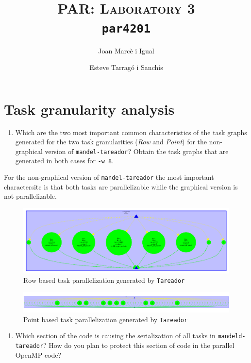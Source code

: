 \documentclass[a4paper]{article}
\title{
	\textsc{PAR: Laboratory 3} \\
	\texttt{\large par4201}
}
\author{Joan Marcè i Igual \and Esteve Tarragó i Sanchís}
\begin{document}
\maketitle
\tableofcontents
\pagebreak

\section{Task granularity analysis}

\begin{enumerate}
	\item Which are the two most important common characteristics of the task graphs generated for the two task granularities (\textit{Row} and \textit{Point}) for the non-graphical version of \texttt{mandel-tareador}? Obtain the task graphs that are generated in both cases for \texttt{-w 8}.
\end{enumerate}

For the non-graphical version of \verb|mandel-tareador| the most important charactersitc is that both tasks are parallelizable while the graphical version is not parallelizable. 

\begin{figure}[H]
	\centering
	\includegraphics[width=\textwidth]{images/depend_row_text}
	\caption{Row based task parallelization generated by \texttt{Tareador}}
\end{figure}
\begin{figure}[H]
	\centering
	\includegraphics[width=\textwidth]{images/depend_point_text}
	\caption{Point based task parallelization generated by \texttt{Tareador}}
\end{figure}

\begin{enumerate}[resume]
	\item Which section of the code is causing the serialization of all tasks in \texttt{mandeld-tareador}? How do you plan to protect this section of code in the parallel OpenMP code?
\end{enumerate}
\end{document}
